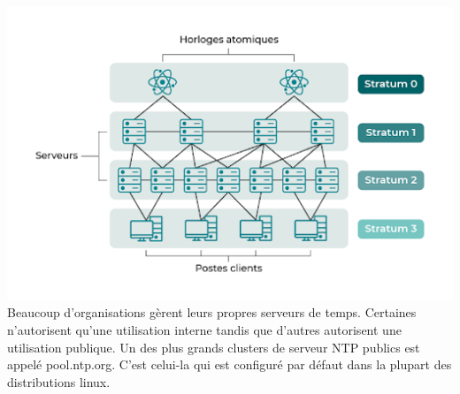 \documentclass[a4paper]{article}
\begin{document}
\begin{adjustwidth}{-2cm}{-2cm}
\includegraphics[scale=0.6]{picture/2.png} 
\newline
Beaucoup d'organisations gèrent leurs propres serveurs de temps. Certaines n’autorisent qu’une utilisation interne tandis que d'autres autorisent une utilisation publique. Un des plus grands clusters de serveur NTP publics est appelé pool.ntp.org. C’est celui-la qui est configuré par défaut dans la plupart des distributions linux.

\newpage

\end{adjustwidth}
\end{document}
